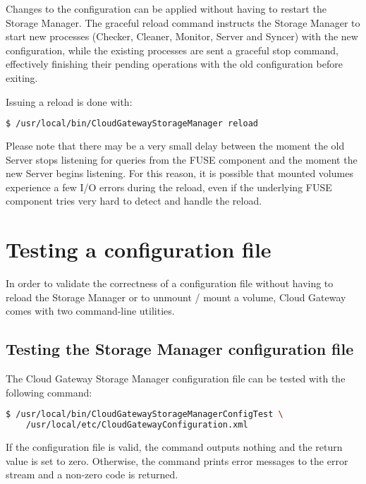 \documentclass[11pt,fleqn,openany]{book} %
\begin{document}
Changes to the configuration can be applied without having to restart the Storage Manager. The graceful reload
command instructs the Storage Manager to start new processes (Checker, Cleaner, Monitor, Server and Syncer) with
the new configuration, while the existing processes are sent a graceful stop command, effectively finishing their
pending operations with the old configuration before exiting.

Issuing a reload is done with:\\

\begin{lstlisting}[language=bash]
$ /usr/local/bin/CloudGatewayStorageManager reload
\end{lstlisting}

Please note that there may be a very small delay between the moment the old Server stops listening for queries
from the FUSE component and the moment the new Server begins listening. For this reason, it is possible that mounted
volumes experience a few I/O errors during the reload, even if the underlying FUSE component tries very hard to
detect and handle the reload.

\section{Testing a configuration file}
\label{sec:testing-a-configuration-file}

In order to validate the correctness of a configuration file without having to reload the Storage Manager or
to unmount / mount a volume, Cloud Gateway comes with two command-line utilities.

\subsection{Testing the Storage Manager configuration file}

The Cloud Gateway Storage Manager configuration file can be tested with the following command:\\

\begin{lstlisting}[language=bash]
$ /usr/local/bin/CloudGatewayStorageManagerConfigTest \
    /usr/local/etc/CloudGatewayConfiguration.xml
\end{lstlisting}

If the configuration file is valid, the command outputs nothing and the return value is set to zero. Otherwise,
the command prints error messages to the error stream and a non-zero code is returned.
\end{document}
